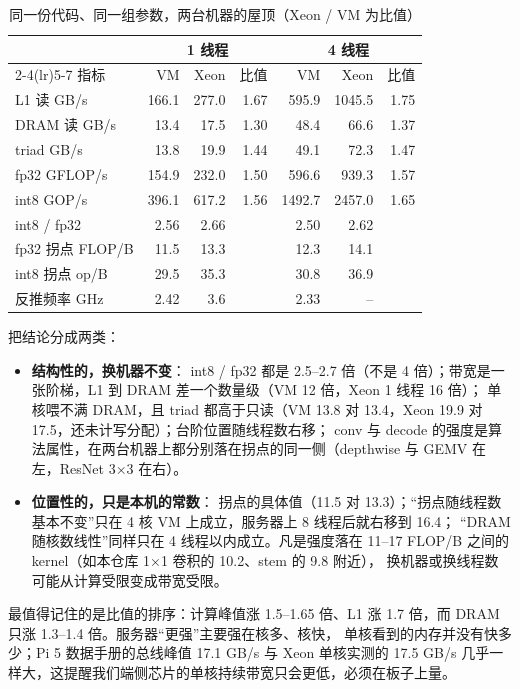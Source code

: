 \documentclass[11pt,a4paper]{ctexart}
\begin{document}
\begin{table}[H]
\centering\small
\caption{同一份代码、同一组参数，两台机器的屋顶（Xeon / VM 为比值）}\label{tab:compare}
\begin{tabular}{lrrrrrr}
\toprule
 & \multicolumn{3}{c}{1 线程} & \multicolumn{3}{c}{4 线程} \\
\cmidrule(lr){2-4}\cmidrule(lr){5-7}
指标 & VM & Xeon & 比值 & VM & Xeon & 比值 \\
\midrule
L1 读 GB/s & 166.1 & 277.0 & 1.67 & 595.9 & 1045.5 & 1.75 \\
DRAM 读 GB/s & 13.4 & 17.5 & 1.30 & 48.4 & 66.6 & 1.37 \\
triad GB/s & 13.8 & 19.9 & 1.44 & 49.1 & 72.3 & 1.47 \\
fp32 GFLOP/s & 154.9 & 232.0 & 1.50 & 596.6 & 939.3 & 1.57 \\
int8 GOP/s & 396.1 & 617.2 & 1.56 & 1492.7 & 2457.0 & 1.65 \\
int8 / fp32 & 2.56 & 2.66 & & 2.50 & 2.62 & \\
fp32 拐点 FLOP/B & 11.5 & 13.3 & & 12.3 & 14.1 & \\
int8 拐点 op/B & 29.5 & 35.3 & & 30.8 & 36.9 & \\
反推频率 GHz & 2.42 & 3.6 & & 2.33 & -- & \\
\bottomrule
\end{tabular}
\end{table}

 把结论分成两类：

\begin{itemize}
  \item \textbf{结构性的，换机器不变}：
  int8 / fp32 都是 2.5--2.7 倍（不是 4 倍）；带宽是一张阶梯，L1 到 DRAM 差一个数量级（VM 12 倍，Xeon 1 线程 16 倍）；
  单核喂不满 DRAM，且 triad 都高于只读（VM 13.8 对 13.4，Xeon 19.9 对 17.5，还未计写分配）；台阶位置随线程数右移；
  conv 与 decode 的强度是算法属性，在两台机器上都分别落在拐点的同一侧（depthwise 与 GEMV 在左，ResNet 3×3 在右）。
  \item \textbf{位置性的，只是本机的常数}：
  拐点的具体值（11.5 对 13.3）；“拐点随线程数基本不变”只在 4 核 VM 上成立，服务器上 8 线程后就右移到 16.4；
  “DRAM 随核数线性”同样只在 4 线程以内成立。凡是强度落在 11--17 FLOP/B 之间的 kernel（如本仓库 1×1 卷积的 10.2、stem 的 9.8 附近），
  换机器或换线程数可能从计算受限变成带宽受限。
\end{itemize}

最值得记住的是比值的排序：计算峰值涨 1.5--1.65 倍、L1 涨 1.7 倍，而 DRAM 只涨 1.3--1.4 倍。服务器“更强”主要强在核多、核快，
单核看到的内存并没有快多少；Pi 5 数据手册的总线峰值 17.1 GB/s 与 Xeon 单核实测的 17.5 GB/s 几乎一样大，这提醒我们端侧芯片的单核持续带宽只会更低，必须在板子上量。
\end{document}
